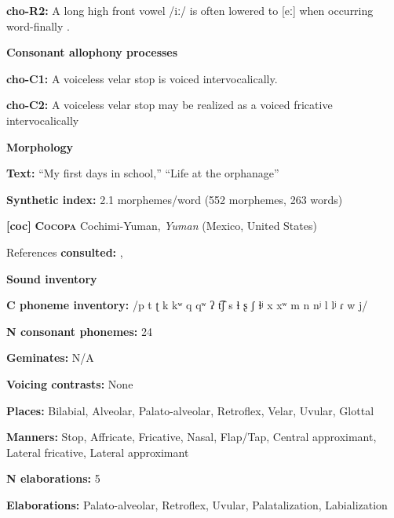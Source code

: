 \textbf{cho-R2:} A long high front vowel /iː/ is often lowered to [eː] when occurring word-finally \citep[30]{Broadwell2006}.



\textbf{Consonant allophony processes}



\textbf{cho-C1:} A voiceless velar stop is voiced intervocalically. \citep[15]{Broadwell2006}



\textbf{cho-C2:}  A voiceless velar stop may be realized as a voiced fricative intervocalically \citep[15]{Broadwell2006}



\textbf{Morphology}



\textbf{Text:} “My first days in school,” “Life at the orphanage” \citep[355-360]{Broadwell2006}



\textbf{Synthetic index:} 2.1 morphemes/word (552 morphemes, 263 words)



\textbf{[coc]}   \textbf{\textsc{Cocopa}}    Cochimi-Yuman, \textit{Yuman} (Mexico, United States)



References \textbf{consulted:} \citet{Bendixen1980}, \citet{Crawford1966}



\textbf{Sound inventory}



\textbf{C phoneme inventory:} /p t ʈ k kʷ q qʷ ʔ t͡ʃ s ɬ ʂ ʃ ɬʲ x xʷ m n nʲ l lʲ ɾ w j/



\textbf{N consonant phonemes:} 24



\textbf{Geminates:} N/A



\textbf{Voicing contrasts:} None



\textbf{Places:} Bilabial, Alveolar, Palato-alveolar, Retroflex, Velar, Uvular, Glottal



\textbf{Manners:} Stop, Affricate, Fricative, Nasal, Flap/Tap, Central approximant, Lateral fricative, Lateral approximant



\textbf{N elaborations:} 5



\textbf{Elaborations:} Palato-alveolar, Retroflex, Uvular, Palatalization, Labialization



